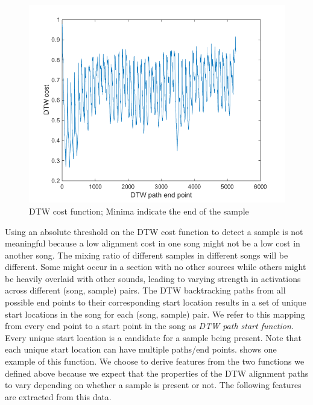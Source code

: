 \documentclass{article}
\begin{document}
\begin{figure}[t]
\centering
\includegraphics[width=\linewidth]{DTWcost.png}
\caption{DTW cost function; Minima indicate the end of the sample}
\label{fig3}
\end{figure}

Using an absolute threshold on the DTW cost function to detect a sample is not meaningful because a low alignment cost in one song might not be a low cost in another song. The mixing ratio of different samples in different songs will be different. Some might occur in a section with no other sources while others might be heavily overlaid with other sounds, leading to varying strength in activations across different (song, sample) pairs. The DTW backtracking paths from all possible end points to their corresponding start location results in a set of unique start locations in the song for each (song, sample) pair. We refer to this mapping from every end point to a start point in the song as \textit{DTW path start function}. Every unique start location is a candidate for a sample being present. Note that each unique start location can have multiple paths/end points.  shows one example of this function.
We choose to derive features from the two functions we defined above because we expect that the properties of the DTW alignment paths to vary depending on whether a sample is present or not. The following features are extracted from this data. 

\end{document}
